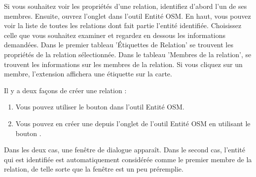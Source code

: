 Si vous souhaitez voir les propriétés d'une relation, identifiez d'abord l'un de ses membres. Ensuite, ouvrez l'onglet  dans l'outil Entité OSM. En haut, vous pouvez voir la liste de toutes les relations dont fait partie l'entité identifiée. Choisissez celle que vous souhaitez examiner et regardez en dessous les informations demandées. Dans le premier tableau 'Étiquettes de Relation' se trouvent les propriétés de la relation sélectionnée. Dans le tableau 'Membres de la relation', se trouvent les informations sur les membres de la relation. Si vous cliquez sur un membre, l'extension affichera une étiquette sur la carte.


Il y a deux façons de créer une relation :
\begin{enumerate}
\item Vous pouvez utiliser le bouton  dans l'outil Entité OSM.
\item  Vous pouvez en créer une depuis l'onglet  de l'outil Entité OSM en utilisant le bouton .
\end{enumerate}

Dans les deux cas, une fenêtre de dialogue apparaît. Dans le second cas, l'entité qui est identifiée est automatiquement considérée comme le premier membre de la relation, de telle sorte que la fenêtre est un peu préremplie.

